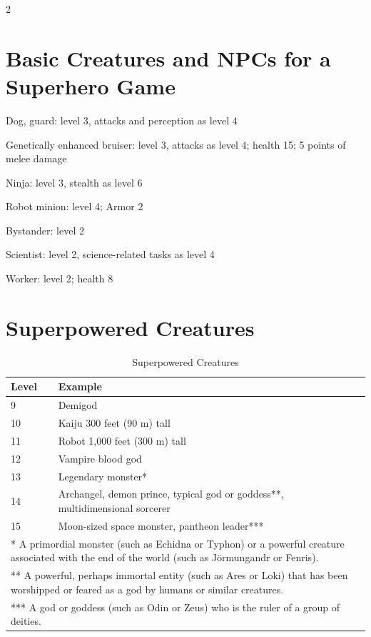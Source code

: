 \begin{multicols}{2}

\chapter{Basic Creatures and NPCs for a Superhero Game}

Dog, guard: level 3, attacks and perception as level 4

Genetically enhanced bruiser: level 3, attacks as level 4; health 15; 5 points of melee damage

Ninja: level 3, stealth as level 6

Robot minion: level 4; Armor 2

Bystander: level 2

Scientist: level 2, science-related tasks as level 4

Worker: level 2; health 8

\chapter{Superpowered Creatures}

\end{multicols}

\begin{table}[h]
\centering
\caption{Superpowered Creatures}
\label{tab:Superpowered Creatures}
\begin{tabularx}{\textwidth}{| p{1cm} | X |}
\hline
Level & Example \\ \hline
9 & Demigod \\ \hline
10 & Kaiju 300 feet (90 m) tall \\ \hline
11 & Robot 1,000 feet (300 m) tall \\ \hline
12 & Vampire blood god \\ \hline
13 & Legendary monster* \\ \hline
14 & Archangel, demon prince, typical god or goddess**, multidimensional sorcerer \\ \hline
15 & Moon-sized space monster, pantheon leader*** \\ \hline
 \multicolumn{2}{|p{17cm}|}{* A primordial monster (such as Echidna or Typhon) or a powerful creature associated with the end of the world (such as Jörmungandr or Fenris).} \\ \hline
\multicolumn{2}{|p{17cm}|}{** A powerful, perhaps immortal entity (such as Ares or Loki) that has been worshipped or feared as a god by humans or similar creatures.} \\ \hline
\multicolumn{2}{|p{17cm}|}{*** A god or goddess (such as Odin or Zeus) who is the ruler of a group of deities.} \\ \hline

\end{tabularx}
\end{table}

